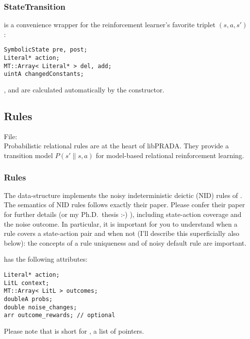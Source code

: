 \documentclass[10pt,twoside,twocolumn,fleqn]{article}
\begin{document}
\subsubsection{StateTransition}
\label{sec:state-transition}

 is a convenience wrapper for the reinforcement
learner's favorite triplet $(s,a,s')$:
\begin{lstlisting}
SymbolicState pre, post;
Literal* action;
MT::Array< Literal* > del, add;
uintA changedConstants;
\end{lstlisting}
,  and  are calculated
automatically by the constructor.





\subsection{Rules}

File: \\

Probabilistic relational rules are at the heart of libPRADA. They provide
a transition model $P(s' \| s,a)$ for model-based relational reinforcement
learning.


\subsubsection{Rules}

The data-structure  implements the noisy indeterministic deictic
(NID) rules of \cite{pasula07ai}. The semantics of NID rules follows
exactly their paper. Please confer their paper for further details (or my
Ph.D.~thesis \citet{11-lang-phd} :-) ), including state-action coverage
and the noise outcome. In particular, it is important for you to understand
when a rule covers a state-action pair and when not (I'll describe this
superficially also below): the concepts of a rule uniqueness and of noisy
default rule are important.

 has the following attributes:
\begin{lstlisting}
Literal* action;
LitL context;
MT::Array< LitL > outcomes;
doubleA probs;
double noise_changes;
arr outcome_rewards; // optional
\end{lstlisting}
Please note that  is short for , a
list of  pointers.
\end{document}
